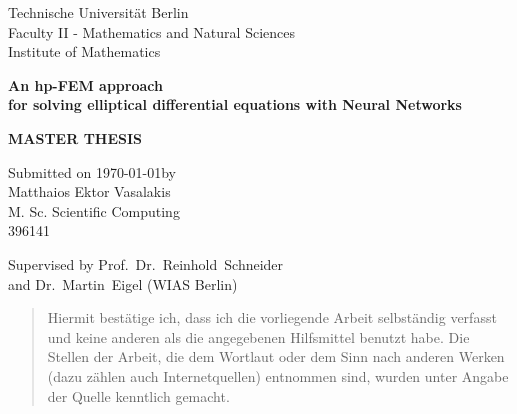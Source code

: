 \afterpage{\blankpage}
\begin{titlepage}
	\centering
	{\large Technische Universität Berlin\\Faculty II - Mathematics and Natural Sciences\\Institute of Mathematics \par}
	\vfill
	{\LARGE\bfseries \textbf{An hp-FEM approach\\for solving elliptical differential equations with Neural Networks} \par}
	\vfill
	{\LARGE\bfseries \textbf{MASTER THESIS} \par}
	\vfill
	{\large Submitted on \today \space by\\Matthaios Ektor Vasalakis\\M. Sc. Scientific Computing\\396141 \par}
	\vfill
	{Supervised by Prof.~Dr.~Reinhold~Schneider\\and Dr.~Martin~Eigel (WIAS Berlin)}
\end{titlepage}

\afterpage{\blankpage}
\renewcommand{\abstractname}{Eigenständigkeitserklärung}
\begin{abstract}
    Hiermit bestätige ich, dass ich die vorliegende Arbeit selbständig verfasst und keine anderen als die angegebenen Hilfsmittel benutzt habe. Die Stellen der Arbeit, die dem Wortlaut oder dem Sinn nach anderen Werken (dazu zählen auch Internetquellen) entnommen sind, wurden unter Angabe der Quelle kenntlich gemacht.
\end{abstract}
